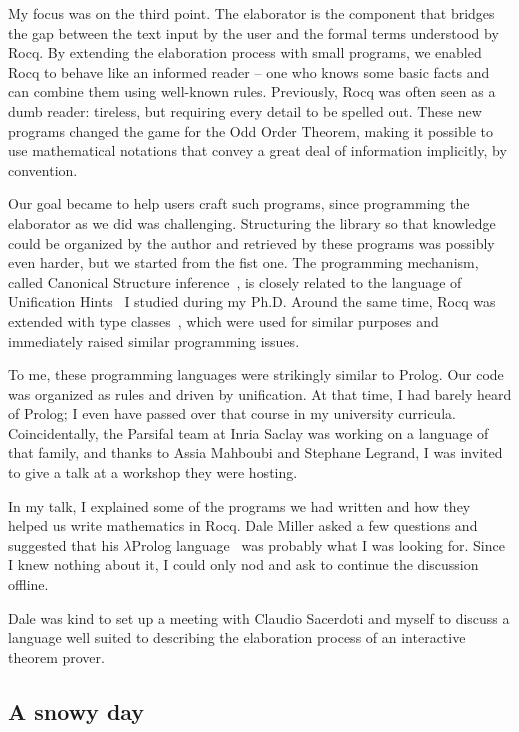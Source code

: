 \documentclass{these-ISSS}
\begin{document}
My focus was on the third point. The elaborator is the component that bridges
the gap between the text input by the user and the formal terms understood by
Rocq. By extending the elaboration process with small programs, we enabled Rocq
to behave like an informed reader -- one who knows some basic facts and can
combine them using well-known rules. Previously, Rocq was often seen as a
dumb reader: tireless, but requiring every detail to be spelled out. These
new programs changed the game for the Odd Order Theorem, making it possible to
use mathematical notations that convey a great deal of information implicitly,
by convention. 

Our goal became to help users craft such programs, since
programming the elaborator as we did was challenging. Structuring the library
so that knowledge could be organized by the author and retrieved by these
programs was possibly even harder, but we started from the fist one.
The programming mechanism, called Canonical Structure
inference~\cite{tassi13}, is closely related to the language of Unification
Hints~\cite{asperti09} I studied during my Ph.D. Around the same time, Rocq was
extended with type classes~\cite{fctc}, which were used for similar purposes
and immediately raised similar programming issues.

To me, these programming languages were strikingly similar to Prolog. Our code was organized
as rules and driven by unification. At that time, I had barely heard of Prolog;
I even have passed over that course in my university curricula.
Coincidentally, the Parsifal team at Inria Saclay was working on a language of
that family, and thanks to Assia Mahboubi and Stephane Legrand, I was invited
to give a talk at a workshop they were hosting.

In my talk, I explained some of the programs we had written and how they helped
us write mathematics in Rocq. Dale Miller asked a few questions and suggested
that his $\lambda$Prolog language~\cite{10.1093/logcom/1.4.497} was probably
what I was looking for. Since I knew nothing about it, I could only nod and ask
to continue the discussion offline.

Dale was kind to set up a meeting with Claudio Sacerdoti and myself to
discuss a language well suited to describing the elaboration process of an
interactive theorem prover.

\subsection{A snowy day}
\end{document}
